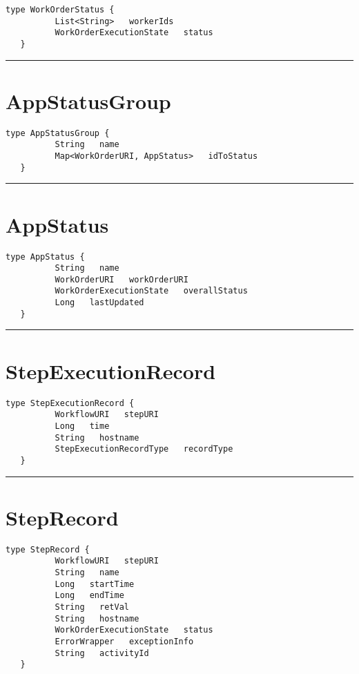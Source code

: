 \begin{lstlisting}[style=nonumbers]
   type WorkOrderStatus {
          List<String>   workerIds
          WorkOrderExecutionState   status
   }
\end{lstlisting}

\rule{12cm}{2pt}
\section{AppStatusGroup}
\label{type:AppStatusGroup}

\begin{lstlisting}[style=nonumbers]
   type AppStatusGroup {
          String   name
          Map<WorkOrderURI, AppStatus>   idToStatus
   }
\end{lstlisting}

\rule{12cm}{2pt}
\section{AppStatus}
\label{type:AppStatus}

\begin{lstlisting}[style=nonumbers]
   type AppStatus {
          String   name
          WorkOrderURI   workOrderURI
          WorkOrderExecutionState   overallStatus
          Long   lastUpdated
   }
\end{lstlisting}

\rule{12cm}{2pt}
\section{StepExecutionRecord}
\label{type:StepExecutionRecord}

\begin{lstlisting}[style=nonumbers]
   type StepExecutionRecord {
          WorkflowURI   stepURI
          Long   time
          String   hostname
          StepExecutionRecordType   recordType
   }
\end{lstlisting}

\rule{12cm}{2pt}
\section{StepRecord}
\label{type:StepRecord}

\begin{lstlisting}[style=nonumbers]
   type StepRecord {
          WorkflowURI   stepURI
          String   name
          Long   startTime
          Long   endTime
          String   retVal
          String   hostname
          WorkOrderExecutionState   status
          ErrorWrapper   exceptionInfo
          String   activityId
   }
\end{lstlisting}

